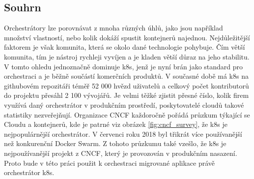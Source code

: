 \subsection{Souhrn}
Orchestrátory lze porovnávat z mnoha různých úhlů, jako jsou například množství vlastností, nebo kolik dokáží spustit kontejnerů najednou. Nejdůležitější faktorem je však komunita, která se okolo dané technologie pohybuje. Čím větší komunita, tím je nástroj rychleji vyvíjen a je kladen větší důraz na jeho stabilitu. V tomto ohledu jednoznačně dominuje k8s, jenž je nyní brán jako standard pro orchestraci a je běžně součástí komerčních produktů. V současné době má k8s na githubovém repozitáři téměř 52 000 hvězd uživatelů a celkový počet kontributorů do projektu přesáhl 2 100 vývojářů. Je velmi těžké zjistit přesné číslo, kolik firem využívá daný orchestrátor v produkčním prostředí, poskytovatelé cloudů takové statistiky nezveřejňují. Organizace CNCF každoročně pořádá průzkum týkající se Cloudu a kontejnerů, kde je patrné viz obrázek \ref{fig:cncf_survey}, že k8s je nejpopulárnější orchestrátor. V červenci roku 2018 byl třikrát více používanější než konkurenční Docker Swarm. Z tohoto průzkumu také vzešlo, že k8s je nejpoužívanější projekt z CNCF, který je provozován v produkčním nasazení. Proto bude v této práci použit k orchestraci migrované aplikace právě orchestrátor k8s.

